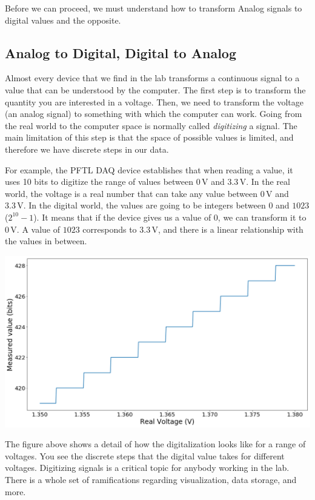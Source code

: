 Before we can proceed, we must understand how to transform Analog signals to digital values and the opposite.

\subsection{Analog to Digital, Digital to Analog}\label{subsec:adc-dca}
Almost every device that we find in the lab transforms a continuous signal to a value that can be understood by the computer. The first step is to transform the quantity you are interested in a voltage. Then, we need to transform the voltage (an analog signal) to something with which the computer can work. Going from the real world to the computer space is normally called \emph{digitizing} a signal. The main limitation of this step is that the space of possible values is limited, and therefore we have discrete steps in our data.

For example, the {PFTL DAQ} device establishes that when reading a value, it uses 10 bits to digitize the range of values between $0\,\textrm{V}$ and $3.3\,\textrm{V}$. In the real world, the voltage is a real number that can take any value between $0\,\textrm{V}$ and $3.3\,\textrm{V}$. In the digital world, the values are going to be integers between $0$ and $1023$ ($2^{10}-1$). It means that if the device gives us a value of $0$, we can transform it to $0\,\textrm{V}$. A value of $1023$ corresponds to $3.3\,\textrm{V}$, and there is a linear relationship with the values in between.

\begin{center}
\includegraphics[width=.6\textwidth]{images/Chapter_03/digitalization.png}
\end{center}

The figure above shows a detail of how the digitalization looks like for a range of voltages. You see the discrete steps that the digital value takes for different voltages. Digitizing signals is a critical topic for anybody working in the lab. There is a whole set of ramifications regarding visualization, data storage, and more.

